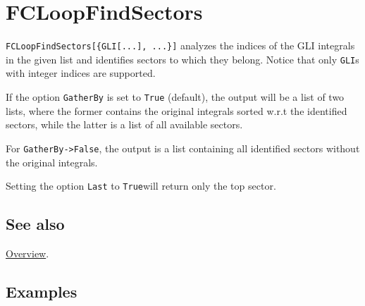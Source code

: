 \documentclass[../FeynCalcManual.tex]{subfiles}
\begin{document}
\hypertarget{fcloopfindsectors}{
\section{FCLoopFindSectors}\label{fcloopfindsectors}}

\texttt{FCLoopFindSectors[\allowbreak{}\{\allowbreak{}GLI[\allowbreak{}...],\ \allowbreak{}...\}]}
analyzes the indices of the GLI integrals in the given list and
identifies sectors to which they belong. Notice that only \texttt{GLI}s
with integer indices are supported.

If the option \texttt{GatherBy} is set to \texttt{True} (default), the
output will be a list of two lists, where the former contains the
original integrals sorted w.r.t the identified sectors, while the latter
is a list of all available sectors.

For \texttt{GatherBy->False}, the output is a list containing all
identified sectors without the original integrals.

Setting the option \texttt{Last} to \texttt{True}will return only the
top sector.

\subsection{See also}

\hyperlink{toc}{Overview}.

\subsection{Examples}

\begin{Shaded}
\begin{Highlighting}[]
\ExtensionTok{=} \OperatorTok{\{}
\OperatorTok{[}\OperatorTok{,} \OperatorTok{\{}\OperatorTok{,} \OperatorTok{,} \OperatorTok{,} \OperatorTok{\}],} 
\OperatorTok{[}\OperatorTok{,} \OperatorTok{\{}\OperatorTok{,} \OperatorTok{,} \OperatorTok{,} \OperatorTok{\}],} 
\OperatorTok{[}\OperatorTok{,} \OperatorTok{\{}\OperatorTok{,} \OperatorTok{,} \OperatorTok{,} \OperatorTok{\}],} 
\OperatorTok{[}\OperatorTok{,} \OperatorTok{\{}\OperatorTok{,} \OperatorTok{,} \OperatorTok{,} \SpecialCharTok{{-}}\OperatorTok{\}]} 
   \OperatorTok{\}}\NormalTok{;}
\end{Highlighting}
\end{Shaded}
\end{document}
